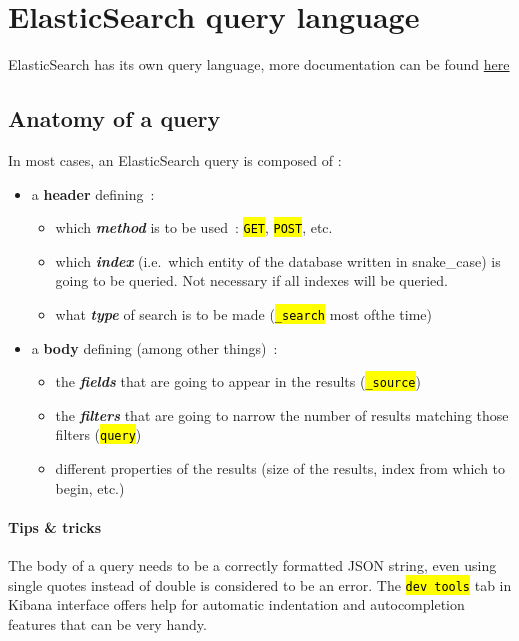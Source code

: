 \documentclass[a4paper,12pt]{article}
\let\OldTexttt\texttt
\renewcommand{\texttt}[1]{\OldTexttt{\hl{#1}}}
\begin{document}
\section{ElasticSearch query language}\label{elasticsearch-query-language}

ElasticSearch has its own query language, more documentation can be
found \href{https://www.elastic.co/guide/en/elasticsearch/reference/current/query-dsl.html}{here}

\subsection{Anatomy of a query}\label{anatomy-of-a-query}

In most cases, an ElasticSearch query is composed of :
\begin{itemize}
	\item a \textbf{header} defining~:
	\begin{itemize}
		\item which \textbf{\emph{method}} is to be used~: \texttt{GET}, \texttt{POST}, etc.
		\item which \textbf{\emph{index}} (i.e.~which entity of the database written in snake\_case) is going to be queried. Not necessary if all indexes will be queried.
		\item what \textbf{\emph{type}} of search is to be made (\texttt{\_search} most ofthe time)
	\end{itemize}
	\item a \textbf{body} defining (among other things)~:
	\begin{itemize}
		\item the \textbf{\emph{fields}} that are going to appear in the results (\texttt{\_source})
		\item the \textbf{\emph{filters}} that are going to narrow the number of results matching those filters (\texttt{query})
		\item different properties of the results (size of the results, index from which to begin, etc.)
	\end{itemize}
\end{itemize}

\paragraph{Tips \& tricks}\label{tips-tricks}

The body of a query needs to be a correctly formatted JSON string, even using single quotes instead of double is considered to be an error. The \texttt{dev tools} tab in Kibana interface offers help for automatic indentation and autocompletion features that can be very handy.
\end{document}
